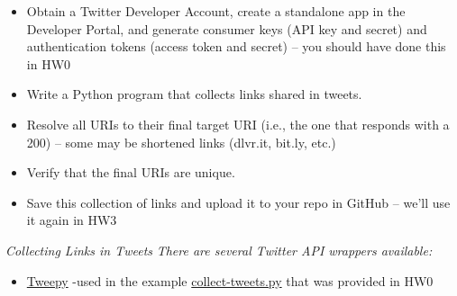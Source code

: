 \documentclass[12pt]{article}
\begin{document}
\begin{itemize}
    \item Obtain a Twitter Developer Account, create a standalone app in the Developer Portal, and generate consumer keys (API key and secret) and authentication tokens (access token and secret) -- you should have done this in HW0
    \item Write a Python program that collects links shared in tweets.
    \item Resolve all URIs to their final target URI (i.e., the one that responds with a 200) -- some may be shortened links (dlvr.it, bit.ly, etc.)

    \item Verify that the final URIs are unique.
    \item Save this collection of links and upload it to your repo in GitHub -- we'll use it again in HW3
        
\end{itemize}
\emph{Collecting Links in Tweets}
\newline
\emph{There are several Twitter API wrappers available:}
\begin{itemize}
    \item \href{https://www.tweepy.org/}{Tweepy} -used in the example \href{https://github.com/cs432-websci-master/public/blob/main/spr21/collect-tweets.py}{collect-tweets.py} that was provided in HW0
\end{itemize}
\end{document}
